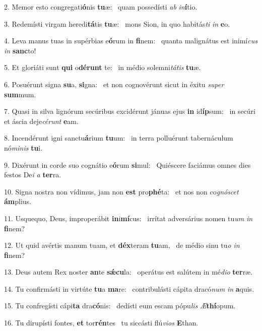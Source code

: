 2. Memor esto congregati\textbf{ó}nis \textbf{tu}æ: \ast\  quam possedísti \textit{ab} \textit{in}\textbf{í}tio.\

3. Redemísti virgam heredi\textbf{tá}tis \textbf{tu}æ: \ast\  mons Sion, in quo habitás\textit{ti} \textit{in} \textbf{e}o.\

4. Leva manus tuas in supérbias e\textbf{ó}rum in \textbf{fi}nem: \ast\  quanta malignátus est inimí\textit{cus} \textit{in} \textbf{sanc}to!\

5. Et gloriáti sunt \textbf{qui} o\textbf{dé}\textbf{runt} te: \ast\  in médio solemni\textit{tá}\textit{tis} \textbf{tu}æ.\

6. Posuérunt signa \textbf{su}a, \textbf{si}gna: \ast\  et non cognovérunt sicut in éxitu \textit{su}\textit{per} \textbf{sum}mum.\

7. Quasi in silva lignórum secúribus excidérunt jánuas ejus \textbf{in} id\textbf{íp}sum: \ast\  in secúri et áscia deje\textit{cé}\textit{runt} \textbf{e}am.\

8. Incendérunt igni sanctu\textbf{á}rium \textbf{tu}um: \ast\  in terra polluérunt tabernáculum nó\textit{mi}\textit{nis} \textbf{tu}i.\

9. Dixérunt in corde suo cognátio e\textbf{ó}rum \textbf{si}mul: \ast\  Quiéscere faciámus omnes dies festos De\textit{i} \textit{a} \textbf{ter}ra.\

10. Signa nostra non vídimus, jam non \textbf{est} pro\textbf{phé}ta: \ast\  et nos non co\textit{gnó}\textit{scet} \textbf{ám}plius.\

11. Usquequo, Deus, improperábit \textbf{in}i\textbf{mí}cus: \ast\  irrítat adversárius nomen tu\textit{um} \textit{in} \textbf{fi}nem?\

12. Ut quid avértis manum tuam, et \textbf{déx}teram \textbf{tu}am, \ast\  de médio sinu tu\textit{o} \textit{in} \textbf{fi}nem?\

13. Deus autem Rex noster \textbf{an}te \textbf{sǽ}\textbf{cu}la: \ast\  operátus est salútem in mé\textit{di}\textit{o} \textbf{ter}ræ.\

14. Tu confirmásti in virtúte \textbf{tu}a \textbf{ma}re: \ast\  contribulásti cápita dracó\textit{num} \textit{in} \textbf{a}quis.\

15. Tu confregísti cápi\textbf{ta} dra\textbf{có}nis: \ast\  dedísti eum escam pópu\textit{lis} \textit{Æ}\textbf{thí}opum.\

16. Tu dirupísti fontes, \textbf{et} tor\textbf{rén}tes \ast\  tu siccásti flú\textit{vi}\textit{os} \textbf{E}than.\

